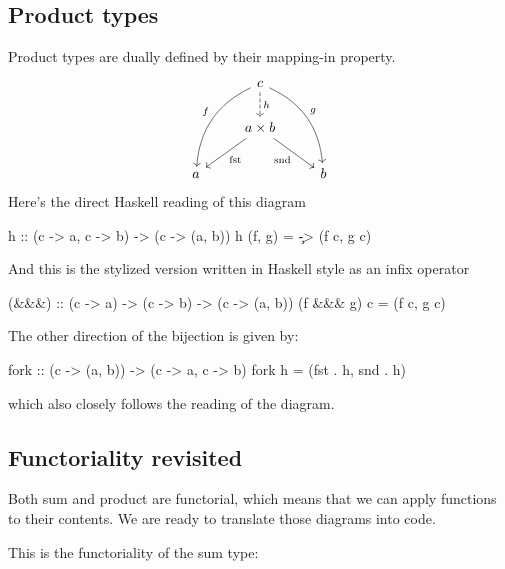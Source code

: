 \documentclass[DaoFP]{subfiles}
\begin{document}
\subsection{Product types}

Product types are dually defined by their mapping-in property.
\[
 \begin{tikzcd}
 & c
\arrow[d, dashed, "h"]
 \arrow[ddl, bend right, "f"']
 \arrow[ddr, bend left, "g"]
\\
&a \times b
 \arrow[dl,  "\text{fst}"]
  \arrow[dr,   "\text{snd}"']
\\
a && b
 \end{tikzcd}
\]
Here's the direct Haskell reading of this diagram
\begin{haskell}
h :: (c -> a, c -> b) -> (c -> (a, b))
h (f, g) = \c -> (f c, g c)
\end{haskell}
And this is the stylized version written in Haskell style as an infix operator \hask{&&&}
\begin{haskell}
(&&&) :: (c -> a) -> (c -> b) -> (c -> (a, b))
(f &&& g) c = (f c, g c)
\end{haskell}
The other direction of the bijection is given by:
\begin{haskell}
fork :: (c -> (a, b)) -> (c -> a, c -> b)
fork h = (fst . h, snd . h)
\end{haskell}
which also closely follows the reading of the diagram.

\subsection{Functoriality revisited}

Both sum and product are functorial, which means that we can apply functions to their contents. We are ready to translate those diagrams into code. 

This is the functoriality of the sum type:
\end{document}
